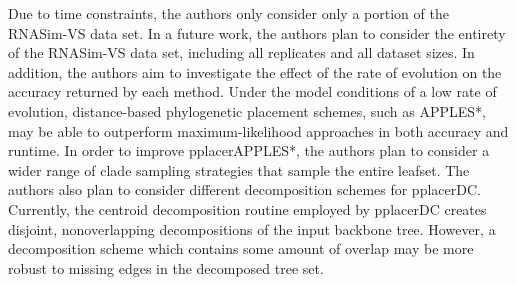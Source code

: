 \documentclass[10pt]{article}
\begin{document}
Due to time constraints, the authors only consider only a portion of the RNASim-VS data set.
In a future work, the authors plan to consider the entirety of the RNASim-VS data set, including all replicates and all dataset sizes.
In addition, the authors aim to investigate the effect of the rate of evolution on the accuracy
returned by each method.
Under the model conditions of a low rate of evolution, distance-based phylogenetic placement schemes,
such as APPLES*, may be able to outperform maximum-likelihood approaches in both accuracy and runtime.
In order to improve pplacerAPPLES*, the authors plan to consider a wider range of clade sampling
strategies that sample the entire leafset.
The authors also plan to consider different decomposition schemes for pplacerDC.
Currently, the centroid decomposition routine employed by pplacerDC creates disjoint, nonoverlapping
decompositions of the input backbone tree.
However, a decomposition scheme which contains some amount of overlap may be more robust to missing
edges in the decomposed tree set.



\end{document}
